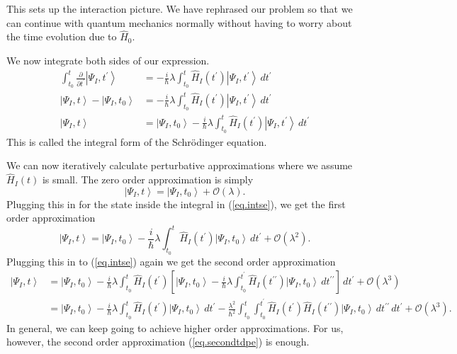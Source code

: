 \documentclass[11pt]{article}
\newcommand{\Od}[1]{\mathcal{O}{\left(#1\right)}}
\newcommand{\ket}[1]{\left|#1\right\rangle}
\newcommand{\op}[1]{\hat{#1}}
\theoremstyle{theorem}
\theoremstyle{remark}
\theoremstyle{step}
\theoremstyle{gap}
\begin{document}
This sets up the interaction picture. We have rephrased our problem so that we can continue with quantum mechanics normally without having to worry about the time evolution due to \(\op{H}_0\).

We now integrate both sides of our expression.
\begin{align}
\int_{t_0}^t \frac{\partial}{\partial t^\prime} \ket{\Psi_I, t^\prime} &= -\frac{i}{\hbar} \lambda \int_{t_0}^t \op{H}_I(t^\prime)\ket{\Psi_I, t^\prime} \,dt^\prime \nonumber\\
\ket{\Psi_I, t} - \ket{\Psi_I, t_0} &= -\frac{i}{\hbar} \lambda \int_{t_0}^t \op{H}_I(t^\prime)\ket{\Psi_I, t^\prime} \,dt^\prime \nonumber\\
\ket{\Psi_I, t} &= \ket{\Psi_I, t_0} - \frac{i}{\hbar} \lambda \int_{t_0}^t \op{H}_I(t^\prime)\ket{\Psi_I, t^\prime} \,dt^\prime \label{eq.intse}
\end{align}
This is called the integral form of the Schr\"odinger equation.

We can now iteratively calculate perturbative approximations where we assume \(\op{H}_I(t)\) is small. The zero order approximation is simply
\[\ket{\Psi_I, t} = \ket{\Psi_I, t_0} + \Od{\lambda}.\]
Plugging this in for the state inside the integral in (\ref{eq.intse}), we get the first order approximation
\begin{equation}\label{eq.firsttdpe}
\ket{\Psi_I, t} = \ket{\Psi_I, t_0} - \frac{i}{\hbar} \lambda \int_{t_0}^t \op{H}_I(t^\prime)\ket{\Psi_I, t_0} \,dt^\prime + \Od{\lambda^2}.
\end{equation}
Plugging this in to (\ref{eq.intse}) again we get the second order approximation
\begin{align}\nonumber
\ket{\Psi_I, t} &= \ket{\Psi_I, t_0} - \frac{i}{\hbar} \lambda \int_{t_0}^t \op{H}_I(t^\prime)\left[\ket{\Psi_I, t_0} - \frac{i}{\hbar} \lambda \int_{t_0}^{t^\prime} \op{H}_I(t^{\prime\prime})\ket{\Psi_I, t_0} \,dt^{\prime\prime}\right] \,dt^\prime + \Od{\lambda^3} \\
&= \ket{\Psi_I, t_0} - \frac{i}{\hbar}\lambda \int_{t_0}^t \op{H}_I (t^\prime) \ket{\Psi_I, t_0}\,dt^\prime - \frac{\lambda^2}{\hbar^2} \int_{t_0}^t \int_{t_0}^{t^\prime} \op{H}_I(t^\prime) \op{H}_I(t^{\prime\prime})\ket{\Psi_I, t_0} \,dt^{\prime\prime}\,dt^\prime + \Od{\lambda^3}.
\label{eq.secondtdpe}\end{align}
In general, we can keep going to achieve higher order approximations. For us, however, the second order approximation (\ref{eq.secondtdpe}) is enough.
\end{document}
